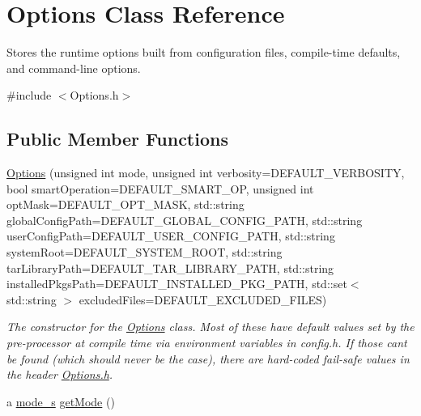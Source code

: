 \hypertarget{classOptions}{}\section{Options Class Reference}
\label{classOptions}


Stores the runtime options built from configuration files, compile-\/time defaults, and command-\/line options.  




{\ttfamily \#include $<$Options.\+h$>$}

\subsection*{Public Member Functions}
\begin{DoxyCompactItemize}
\item 
\mbox{\hyperlink{classOptions_a24cba1d09080384c9939db6682ea57ec}{Options}} (unsigned int mode, unsigned int verbosity=D\+E\+F\+A\+U\+L\+T\+\_\+\+V\+E\+R\+B\+O\+S\+I\+TY, bool smart\+Operation=D\+E\+F\+A\+U\+L\+T\+\_\+\+S\+M\+A\+R\+T\+\_\+\+OP, unsigned int opt\+Mask=D\+E\+F\+A\+U\+L\+T\+\_\+\+O\+P\+T\+\_\+\+M\+A\+SK, std\+::string global\+Config\+Path=D\+E\+F\+A\+U\+L\+T\+\_\+\+G\+L\+O\+B\+A\+L\+\_\+\+C\+O\+N\+F\+I\+G\+\_\+\+P\+A\+TH, std\+::string user\+Config\+Path=D\+E\+F\+A\+U\+L\+T\+\_\+\+U\+S\+E\+R\+\_\+\+C\+O\+N\+F\+I\+G\+\_\+\+P\+A\+TH, std\+::string system\+Root=D\+E\+F\+A\+U\+L\+T\+\_\+\+S\+Y\+S\+T\+E\+M\+\_\+\+R\+O\+OT, std\+::string tar\+Library\+Path=D\+E\+F\+A\+U\+L\+T\+\_\+\+T\+A\+R\+\_\+\+L\+I\+B\+R\+A\+R\+Y\+\_\+\+P\+A\+TH, std\+::string installed\+Pkgs\+Path=D\+E\+F\+A\+U\+L\+T\+\_\+\+I\+N\+S\+T\+A\+L\+L\+E\+D\+\_\+\+P\+K\+G\+\_\+\+P\+A\+TH, std\+::set$<$ std\+::string $>$ excluded\+Files=D\+E\+F\+A\+U\+L\+T\+\_\+\+E\+X\+C\+L\+U\+D\+E\+D\+\_\+\+F\+I\+L\+ES)
\begin{DoxyCompactList}\small\item\em The constructor for the \mbox{\hyperlink{classOptions}{Options}} class. Most of these have default values set by the pre-\/processor at compile time via environment variables in config.\+h. If those can\textquotesingle{}t be found (which should never be the case), there are hard-\/coded fail-\/safe values in the header \mbox{\hyperlink{Options_8h}{Options.\+h}}. \end{DoxyCompactList}\item 
a \mbox{\hyperlink{structmode__s}{mode\+\_\+s}} \mbox{\hyperlink{classOptions_a4faeff2138155356b947d9218bbcb558}{get\+Mode}} ()

\end{DoxyCompactItemize}
